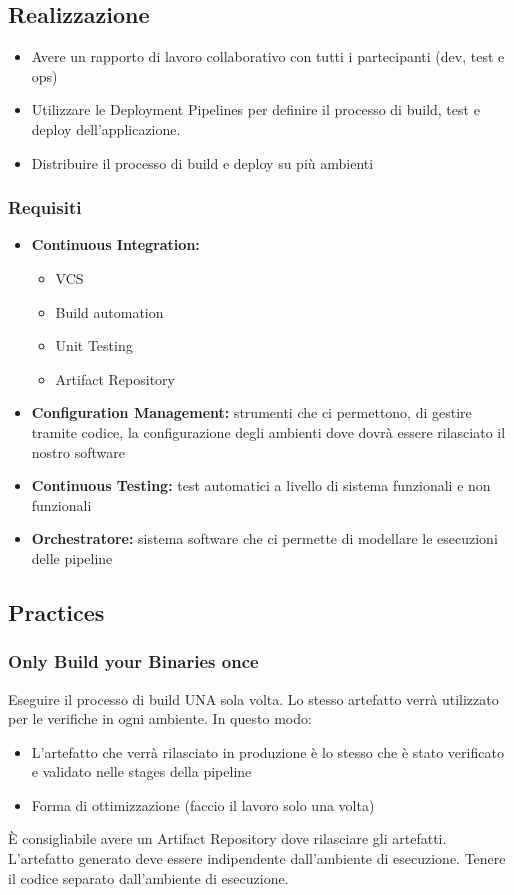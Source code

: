 \subsection{Realizzazione}
\begin{itemize}
    \item Avere un rapporto di lavoro collaborativo con tutti i partecipanti (dev, test e ops)
    \item Utilizzare le Deployment Pipelines per definire il processo di build, test e deploy dell’applicazione.
    \item Distribuire il processo di build e deploy su più ambienti
\end{itemize}

\subsubsection{Requisiti}
\begin{itemize}
    \item \textbf{Continuous Integration:}
    \begin{itemize}
        \item VCS
        \item Build automation
        \item Unit Testing
        \item Artifact Repository
    \end{itemize}
    \item \textbf{Configuration Management:} strumenti che ci permettono, di gestire tramite codice, la configurazione degli ambienti dove dovrà essere rilasciato il nostro software
    \item \textbf{Continuous Testing:} test automatici a livello di sistema funzionali e non funzionali
    \item \textbf{Orchestratore:} sistema software che ci permette di modellare le esecuzioni delle pipeline
\end{itemize}

\subsection{Practices}

\subsubsection{Only Build your Binaries once}
Eseguire il processo di build UNA sola volta. Lo stesso artefatto verrà utilizzato per le verifiche in ogni ambiente.
In questo modo:
\begin{itemize}
    \item L’artefatto che verrà rilasciato in produzione è lo stesso che è stato verificato e validato nelle stages della pipeline
    \item Forma di ottimizzazione (faccio il lavoro solo una volta)
\end{itemize}
È consigliabile avere un Artifact Repository dove rilasciare gli artefatti.
L’artefatto generato deve essere indipendente dall’ambiente di esecuzione.
Tenere il codice separato dall’ambiente di esecuzione.

